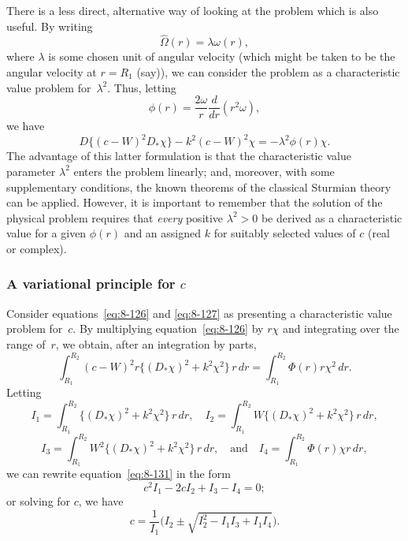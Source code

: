 There is a less direct, alternative way of looking at the problem which is also useful. By writing
\begin{equation}
\label{eq:8-128}
\hat{\Omega}(r) = \lambda\omega(r),
\end{equation}
where $\lambda$ is some chosen unit of angular velocity (which might be taken to be the angular velocity at $r = R_1$ (say)), we can consider the problem as a characteristic value problem for~$\lambda^2$. Thus, letting
\begin{equation}
\label{eq:8-129}
\phi(r) = \frac{2\omega}{r}\frac{d}{dr}(r^2\omega),
\end{equation}
we have
\begin{equation}
\label{eq:8-130}
D\bigl\{(c-W)^2 D_*\chi\bigr\} - k^2(c-W)^2\chi = -\lambda^2\phi(r)\chi.
\end{equation}
The advantage of this latter formulation is that the characteristic value parameter $\lambda^2$ enters the problem linearly; and, moreover, with some supplementary conditions, the known theorems of the classical Sturmian theory can be applied. However, it is important to remember that the solution of the physical problem requires that \emph{every} positive $\lambda^2 > 0$ be derived as a characteristic value for a given $\phi(r)$ and an assigned $k$ for suitably selected values of $c$ (real or complex).

\subsubsection{A variational principle for $c$}
\label{sec:78b-i}

Consider equations~\eqref{eq:8-126} and \eqref{eq:8-127} as presenting a characteristic value problem for~$c$. By multiplying equation~\eqref{eq:8-126} by $r\chi$ and integrating over the range of~$r$, we obtain, after an integration by parts,
\begin{equation}
\label{eq:8-131}
\int_{R_1}^{R_2}(c-W)^2r\bigl\{(D_*\chi)^2 + k^2\chi^2\bigr\}\,r\,dr = \int_{R_1}^{R_2}\Phi(r)r\chi^2\,dr.
\end{equation}
Letting
\begin{equation}
\label{eq:8-132}
I_1 = \int_{R_1}^{R_2}\bigl\{(D_*\chi)^2 + k^2\chi^2\bigr\}\,r\,dr,\quad I_2 = \int_{R_1}^{R_2} W\bigl\{(D_*\chi)^2 + k^2\chi^2\bigr\}\,r\,dr,
\end{equation}
\begin{equation}
\label{eq:8-132b}
I_3 = \int_{R_1}^{R_2} W^2\bigl\{(D_*\chi)^2 + k^2\chi^2\bigr\}\,r\,dr, \quad\text{and}\quad I_4 = \int_{R_1}^{R_2} \Phi(r)\chi r\,dr,
\end{equation}
we can rewrite equation~\eqref{eq:8-131} in the form
\begin{equation}
\label{eq:8-133}
c^2 I_1 - 2cI_2 + I_3 - I_4 = 0;
\end{equation}
or solving for $c$, we have
\begin{equation}
\label{eq:8-134}
c = \frac{1}{I_1}\bigl(I_2 \pm \sqrt{I_2^2 - I_1 I_3 + I_1 I_4}\bigr).
\end{equation}


